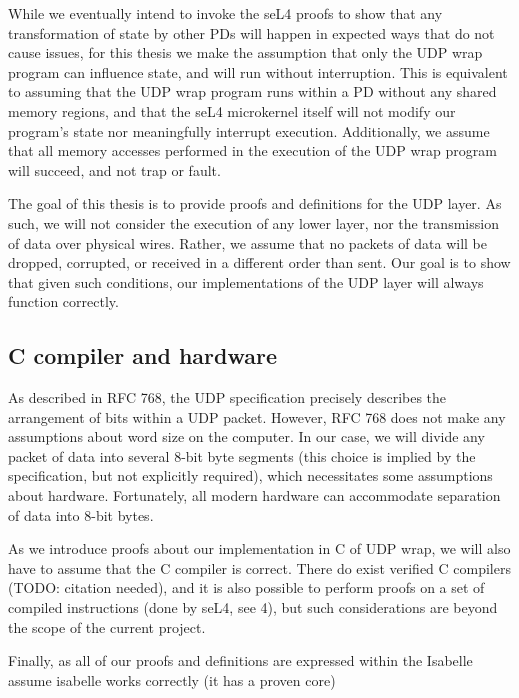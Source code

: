 \documentclass[twoside]{memoir}
\begin{document}
While we eventually intend to invoke the seL4 proofs to show that any
transformation of state by other PDs will happen in expected ways
that do not cause issues,
for this thesis we make the assumption that
only the UDP wrap program can influence state, and will run without interruption.
This is equivalent to assuming that the UDP wrap program runs within
a PD without any shared memory regions, and that the seL4 microkernel itself
will not modify our program's state nor meaningfully interrupt execution.
Additionally, we assume that all memory accesses performed in the execution of
the UDP wrap program will succeed, and not trap or fault.

The goal of this thesis is to provide proofs and definitions for the UDP
layer.
As such, we will not consider the execution of any lower layer, nor
the transmission of data over physical wires.
Rather, we assume that no packets of data will be dropped, corrupted, or received in
a different order than sent.
Our goal is to show that given such conditions,
our implementations of the UDP layer will always function correctly.

\subsection{C compiler and hardware}
As described in RFC 768, the UDP specification precisely describes
the arrangement of bits within a UDP packet.
However, RFC 768 does not make any assumptions about word size on the computer.
In our case, we will divide any packet of data into several 8-bit byte segments
(this choice is implied by the specification, but not explicitly required),
which necessitates some assumptions about hardware.
Fortunately, all modern hardware can accommodate separation of data
into 8-bit bytes.

As we introduce proofs about our implementation in C of UDP wrap,
we will also have to assume that the C compiler is correct.
There do exist verified C compilers (TODO: citation needed),
and it is also possible to perform proofs on a set of compiled instructions
(done by seL4, see \cite{Klein2014Verification}{4}),
but such considerations are beyond the scope of the current project.

Finally, as all of our proofs and definitions are expressed within the Isabelle 
assume isabelle works correctly (it has a proven core)

%
%
\end{document}
